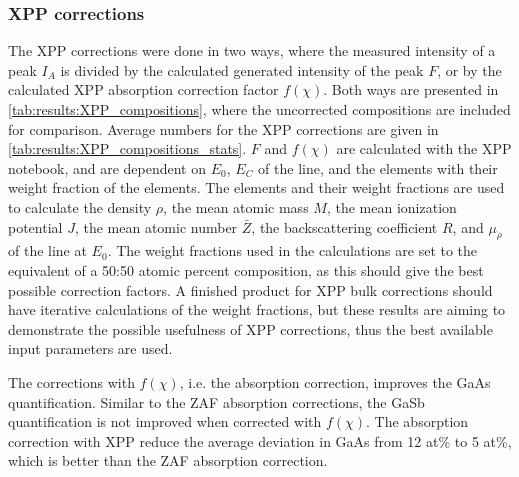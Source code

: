 





\subsubsection{XPP corrections}
\label{results:matrix_corrections:XPP}



The XPP corrections were done in two ways, where the measured intensity of a peak $I_A$ is divided by the calculated generated intensity of the peak $F$, or by the calculated XPP absorption correction factor $f(\chi)$.
Both ways are presented in \cref{tab:results:XPP_compositions}, where the uncorrected compositions are included for comparison.
Average numbers for the XPP corrections are given in \cref{tab:results:XPP_compositions_stats}.
$F$ and $f(\chi)$ are calculated with the XPP notebook, and are dependent on $E_0$, $E_C$ of the line, and the elements with their weight fraction of the elements.
The elements and their weight fractions are used to calculate the density $\rho$, the mean atomic mass $M$, the mean ionization potential $J$, the mean atomic number $\bar{Z}$, the backscattering coefficient $R$, and $\mu_\rho$ of the line at $E_0$.
The weight fractions used in the calculations are set to the equivalent of a 50:50 atomic percent composition, as this should give the best possible correction factors.
A finished product for XPP bulk corrections should have iterative calculations of the weight fractions, but these results are aiming to demonstrate the possible usefulness of XPP corrections, thus the best available input parameters are used.


The corrections with $f(\chi)$, i.e. the absorption correction, improves the GaAs quantification.
Similar to the ZAF absorption corrections, the GaSb quantification is not improved when corrected with $f(\chi)$.
The absorption correction with XPP reduce the average deviation in GaAs from 12 at\% to 5 at\%, which is better than the ZAF absorption correction.

